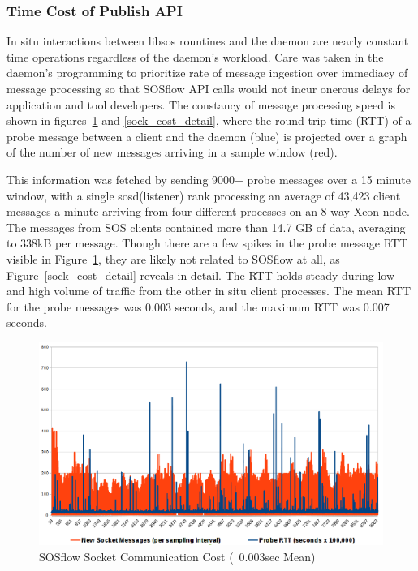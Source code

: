 \subsubsection{Time Cost of Publish API} %
In situ interactions between libsos rountines and the daemon are
nearly constant time operations regardless of the daemon's workload.
%
Care was taken in the daemon's programming to prioritize rate of message
ingestion over immediacy of message processing so that SOSflow API calls
would not incur onerous delays for application and tool developers.
%
The constancy of message processing speed is shown in
figures~\ref{sock_cost} and \ref{sock_cost_detail}, where the round
trip time (RTT) of a probe message between a client and the daemon
(blue) is projected over a graph of the number of new messages
arriving in a sample window (red).
%
\par
%
This information was fetched by sending 9000+ probe messages over a 15
minute window, with a single sosd(listener) rank processing an average
of 43,423 client messages a minute arriving from four different
processes on an 8-way Xeon node.
%
The messages from SOS clients contained more than 14.7 GB of data,
averaging to 338kB per message.
%
Though there are a few spikes in the probe message RTT visible in
Figure~\ref{sock_cost}, they are likely not related to SOSflow at all,
as Figure~\ref{sock_cost_detail} reveals in detail.
%
The RTT holds steady during low and high volume of traffic from the
other in situ client processes.
%
The mean RTT for the probe messages was 0.003 seconds, and the maximum
RTT was 0.007 seconds.
\begin{figure}[h]
\centering
\includegraphics[width=\columnwidth]{images/icebox_api_cost_when_slam.png}
\caption{SOSflow Socket Communication Cost (~0.003sec Mean)}
\label{sock_cost}
\end{figure}

